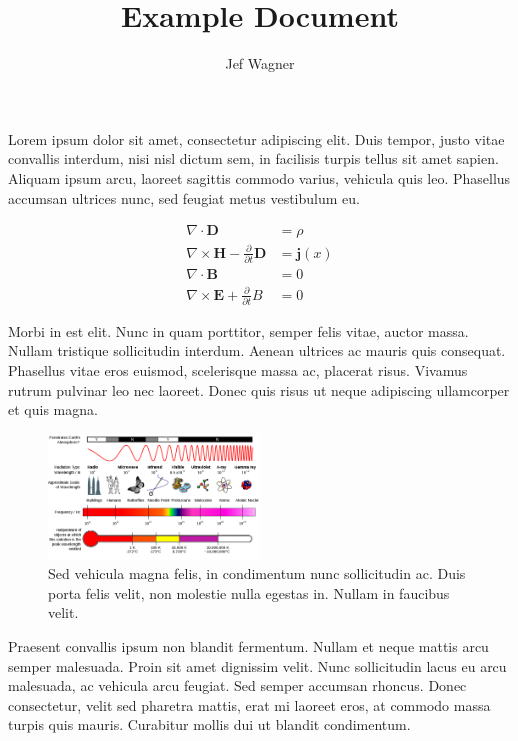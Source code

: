 \documentclass[10pt]{article}
\renewcommand{\vec}[1]{\bm{#1}}
\begin{document}
\title{Example Document}
\author{Jef Wagner}
\maketitle

Lorem ipsum dolor sit amet, consectetur adipiscing elit. Duis tempor,
justo vitae convallis interdum, nisi nisl dictum sem, in facilisis
turpis tellus sit amet sapien. Aliquam ipsum arcu, laoreet sagittis
commodo varius, vehicula quis leo. Phasellus accumsan ultrices nunc,
sed feugiat metus vestibulum eu. 

\begin{subequations}
\begin{align}
  \nabla \cdot \vec{D} &= \rho \\
  \nabla \times \vec{H} - \frac{\partial}{\partial t} 
    \vec{D} &= \vec{j}(x) \\
    \nabla \cdot \vec{B} &= 0 \\
    \nabla \times \vec{E} + \frac{\partial}{\partial t} B &= 0
\end{align}
\end{subequations}

Morbi in est elit. Nunc in quam porttitor, semper felis vitae, auctor
massa. Nullam tristique sollicitudin interdum. Aenean ultrices ac
mauris quis consequat. Phasellus vitae eros euismod, scelerisque
massa ac, placerat risus. Vivamus rutrum pulvinar leo nec laoreet.
Donec quis risus ut neque adipiscing ullamcorper et quis magna.

\begin{figure}[htb]
  \begin{center}
  \includegraphics[width=0.5\textwidth]{figures/EM_Spectrum_Properties.png}
  \caption{Sed vehicula magna felis, in condimentum nunc sollicitudin
    ac. Duis porta felis velit, non molestie nulla egestas in. Nullam
    in faucibus velit.}
  \end{center}
\end{figure}

Praesent convallis ipsum non blandit fermentum. Nullam et neque
mattis arcu semper malesuada. Proin sit amet dignissim velit. Nunc
sollicitudin lacus eu arcu malesuada, ac vehicula arcu feugiat. Sed
semper accumsan rhoncus. Donec consectetur, velit sed pharetra
mattis, erat mi laoreet eros, at commodo massa turpis quis mauris.
Curabitur mollis dui ut blandit condimentum. 
\end{document}
